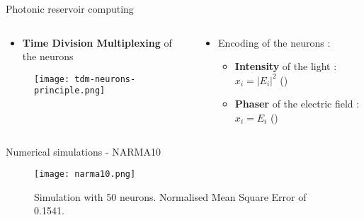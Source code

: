 \begin{frame}{Photonic reservoir computing}
	\begin{columns}
		\begin{column}{.5\textwidth}
			\begin{itemize}
				\item \textbf{Time Division Multiplexing} of the neurons
			\end{itemize}
			\begin{figure}
				\centering
				\texttt{[image: tdm-neurons-principle.png]}
			\end{figure}
		\end{column}%
		\begin{column}{.5\textwidth}
			\begin{itemize}
				\item Encoding of the neurons :
				\begin{itemize}
					\item \textbf{Intensity} of the light : $x_i = |E_i|^2$ (\cite{Paquot2012})
					\item \textbf{Phaser} of the electric field : $x_i = E_i$ (\cite{Vinckier2015})
				\end{itemize}
			\end{itemize}
		\end{column}
	\end{columns}
\end{frame}

\begin{frame}{Numerical simulations - NARMA10}
	\begin{figure}
		\centering
		\texttt{[image: narma10.png]}
		\caption{Simulation with 50 neurons. Normalised Mean Square Error of 0.1541.}
	\end{figure}
\end{frame}